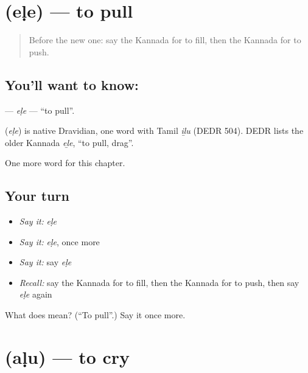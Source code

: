 \section[\texorpdfstring{\kn{ಎಳೆ} (eḷe)}{ಎಳೆ (eḷe)}]{ (eḷe) — to pull}

\label{lesson:KA-C153-ele}



\begin{quote}
Before the new one: say the Kannada for to fill, then the Kannada for to push.
\end{quote}

\subsection*{You'll want to know: }
\textbf{} — \emph{eḷe} — \textquotedblleft{}to pull\textquotedblright{}.

\begin{cousinweb}
\textbf{} (\emph{eḷe}) is native Dravidian, one word with Tamil \emph{iḻu} (DEDR 504). DEDR lists the older Kannada \emph{eḻe}, \textquotedblleft{}to pull, drag\textquotedblright{}.
\end{cousinweb}

\begin{grammarlens}[title={What you've built}]
One more word for this chapter.
\end{grammarlens}

\subsection*{Your turn}
\begin{itemize}
\raggedright
  \item \emph{Say it:} \emph{eḷe}
  \item \emph{Say it:} \emph{eḷe}, once more
  \item \emph{Say it:} say \emph{eḷe}
  \item \emph{Recall:} say the Kannada for to fill, then the Kannada for to push, then say \emph{eḷe} again
\end{itemize}

\begin{tcolorbox}[breakable,colback=teal!4,colframe=teal!35!black,title={Before you move on}]
What does  mean? (\textquotedblleft{}To pull\textquotedblright{}.) Say it once more.
\end{tcolorbox}
\section[\texorpdfstring{\kn{ಅಳು} (aḷu)}{ಅಳು (aḷu)}]{ (aḷu) — to cry}

